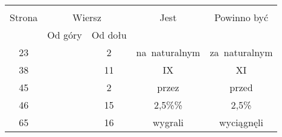 \documentclass[a4paper,11pt]{article}
\begin{document}
\begin{center}
  \begin{tabular}{|c|c|c|c|c|}
    \hline
    & \multicolumn{2}{c|}{} & & \\
    Strona & \multicolumn{2}{c|}{Wiersz} & Jest
                              & Powinno być \\ \cline{2-3}
    & Od góry & Od dołu & & \\
    \hline
    23 & &  2 & na~naturalnym & za~naturalnym \\
    38 & & 11 & IX & XI \\
    45 & &  2 & przez & przed \\
    46 & & 15 & 2,5\%\% & 2,5\% \\
    65 & & 16 & wygrali & wyciągnęli \\
    \hline
  \end{tabular}
\end{center}

\vspace{\spaceTwo}







\end{document}
